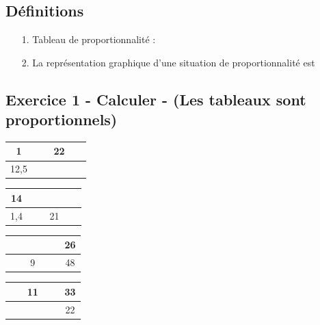 \subsection*{Définitions}
  \begin{enumerate}
    \item[1.] Tableau de proportionnalité : \dotfill \\
    \Pointilles[2]
    \item[2.] La représentation graphique d'une situation de proportionnalité est \dotfill \\
    \Pointilles[1]
  \end{enumerate}

\subsection*{Exercice 1 - Calculer - (Les tableaux sont proportionnels)}

\begin{multicols}{4}\noindent
  \begin{center}
    \begin{tabular}{|c|c|}
      \hline
      1 & 22\\  \hline
      12,5 & $\phantom{azertyuiop}$\\  \hline
    \end{tabular}
  \end{center}
  \Pointilles[2]
  \begin{center}
    \begin{tabular}{|c|c|}
      \hline
      14 & $\phantom{azertyuiop}$\\  \hline
      1,4 & 21\\  \hline
    \end{tabular}
  \end{center}
  \Pointilles[2]
  \begin{center}
    \begin{tabular}{|c|c|}
      \hline
      $\phantom{azertyuiop}$  & 26\\  \hline
      9 & 48\\  \hline
    \end{tabular}
  \end{center}
  \Pointilles[2]
  \begin{center}
    \begin{tabular}{|c|c|}
      \hline
      11 & 33\\  \hline
      $\phantom{azertyuiop}$ & 22\\  \hline
    \end{tabular}
  \end{center}
  \Pointilles[2]
\end{multicols}

